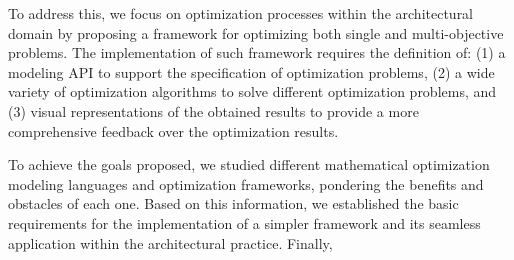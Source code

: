 To address this, we focus on optimization processes within the architectural domain by proposing a framework for optimizing both single and multi-objective problems. The implementation of such framework requires the definition of: (1) a modeling \ac{API} to support the specification of optimization problems, (2) a wide variety of optimization algorithms to solve different optimization problems, and (3) visual representations of the obtained results to provide a more comprehensive feedback over the optimization results.

To achieve the goals proposed, we studied different mathematical optimization modeling languages and optimization frameworks, pondering the benefits and obstacles of each one. Based on this information, we established the basic requirements for the implementation of a simpler framework and its seamless application within the architectural practice. 
Finally, 

